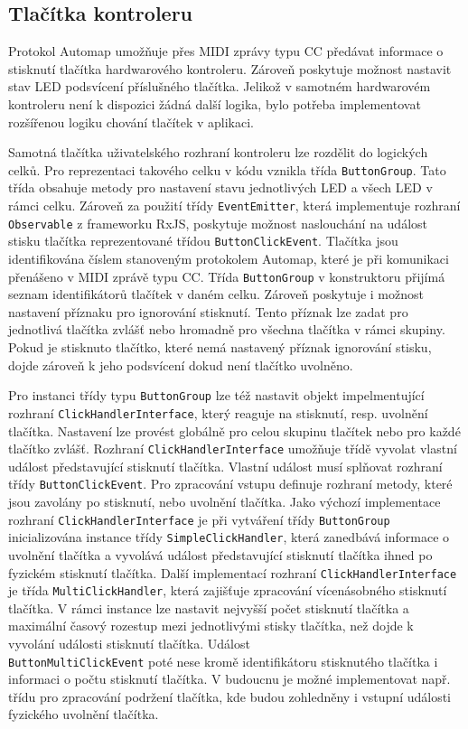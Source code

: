 \documentclass[thesis=M,czech]{FITthesis}[2019/03/06]
\begin{document}
	\subsection{Tlačítka kontroleru}
	Protokol Automap umožňuje přes MIDI zprávy typu CC předávat informace o stisknutí tlačítka
	hardwarového kontroleru. Zároveň poskytuje možnost nastavit stav LED podsvícení příslušného tlačítka.
	Jelikož v samotném hardwarovém kontroleru není k dispozici žádná další logika, bylo potřeba
	implementovat rozšířenou logiku chování tlačítek v aplikaci.
	
	Samotná tlačítka uživatelského rozhraní kontroleru lze rozdělit do logických celků.
	Pro reprezentaci takového celku v kódu vznikla třída \texttt{ButtonGroup}. Tato třída
	obsahuje metody pro nastavení stavu jednotlivých LED a všech LED v rámci celku.
	Zároveň za použití třídy \texttt{EventEmitter}, která implementuje rozhraní \texttt{Observable} 
	z frameworku RxJS, poskytuje možnost naslouchání na událost stisku tlačítka reprezentované třídou \texttt{ButtonClickEvent}.
	Tlačítka jsou identifikována číslem stanoveným protokolem Automap, které je při komunikaci přenášeno
	v MIDI zprávě typu CC. Třída \texttt{ButtonGroup} v konstruktoru přijímá seznam identifikátorů tlačítek
	v daném celku. Zároveň poskytuje i možnost nastavení příznaku pro ignorování stisknutí.
	Tento příznak lze zadat pro jednotlivá tlačítka zvlášť nebo hromadně pro všechna tlačítka v rámci skupiny.
	Pokud je stisknuto tlačítko, které nemá nastavený příznak ignorování stisku, dojde zároveň k jeho podsvícení dokud není tlačítko uvolněno.
	
	Pro instanci třídy typu \texttt{ButtonGroup} lze též nastavit objekt impelmentující rozhraní \texttt{ClickHandlerInterface}, který reaguje
	na stisknutí, resp. uvolnění tlačítka. Nastavení lze provést globálně pro celou skupinu tlačítek nebo pro každé tlačítko zvlášť.
	Rozhraní \texttt{ClickHandlerInterface} umožňuje třídě vyvolat vlastní událost představující stisknutí tlačítka.
	Vlastní událost musí splňovat rozhraní třídy \texttt{ButtonClickEvent}. Pro zpracování vstupu definuje rozhraní metody,	které jsou zavolány po stisknutí, nebo uvolnění tlačítka.
	Jako výchozí implementace rozhraní \texttt{ClickHandlerInterface} je při vytváření třídy \texttt{ButtonGroup} inicializována instance třídy 
	\texttt{SimpleClickHandler}, která zanedbává informace o uvolnění tlačítka a vyvolává událost představující stisknutí tlačítka 
	ihned po fyzickém stisknutí tlačítka. 
	Další implementací rozhraní \texttt{ClickHandlerInterface} je třída \texttt{MultiClickHandler}, která zajišťuje zpracování vícenásobného stisknutí tlačítka. 
	V rámci instance lze nastavit nejvyšší počet stisknutí tlačítka a maximální časový rozestup mezi jednotlivými stisky tlačítka, než dojde k vyvolání události stisknutí tlačítka. 
	Událost \\\texttt{ButtonMultiClickEvent} poté nese kromě identifikátoru stisknutého tlačítka i informaci o počtu stisknutí tlačítka.
	V budoucnu je možné implementovat např. třídu pro zpracování podržení tlačítka, kde budou zohledněny i vstupní události fyzického uvolnění tlačítka.
	
\end{document}
